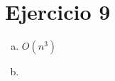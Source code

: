 \documentclass{article}
\begin{document}
\section*{Ejercicio 9}

\begin{enumerate}[a)]
    \item $O(n^3)$
    \item $ $
    
\end{enumerate}
\end{document}
